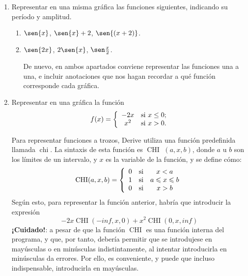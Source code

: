 \begin{enumerate}[leftmargin=*]
	      
	\item Representar en una misma gráfica las funciones siguientes, indicando su período y amplitud.
	      \begin{enumerate}
	      	\item $\sen{x}$, $\sen{x}+2$, $\sen{(x+2)}$.
	      	\item $\sen{2x}$, $2\sen{x}$, $\sen\frac{x}{2}$.
	      	      \begin{indication}
	      	      	De nuevo, en ambos apartados conviene representar las funciones una a una, e incluir anotaciones que nos hagan recordar a qué función
	      	      	corresponde cada gráfica.
	      	      \end{indication}
	      \end{enumerate}
	      
	      
	\item Representar en una gráfica la función
	      \[
	      	\ f(x)=\left\{
	      	\begin{array}{cl}
	      		-2x   & \hbox{si $x\leq0$;} \\
	      		x^{2} & \hbox{si $x>0$.}    \\
	      	\end{array}
	      	\right.
	      \]
	      
	      \begin{indication}
	      	Para representar funciones a trozos, Derive utiliza una función predefinida llamada $\operatorname{chi}$. La sintaxis de esta función es
	      	$\operatorname{CHI}$ $(a,x,b)$, donde $a$ u $b$ son los límites de un intervalo, y $x$ es la variable de la función, y se define cómo:
	      	\[
	      		\operatorname{CHI} (a,x,b) = \left\{ {\begin{array}{*{20}c}
	      			0 & {\text{si}} & {x < a}  \\
	      			1 & {\text{si}} & {a \leqslant x \leqslant b}  \\
	      			0 & {\text{si}} & {x > b}  \\
	      			
	      			\end{array} } \right.
	      	\]
	      	Según esto, para representar la función anterior, habría que introducir la expresión
	      	\[
	      		-2x \operatorname{CHI}(-inf,x,0)+x^2\operatorname{CHI}(0,x,inf)
	      	\]
	      	\textbf{¡Cuidado!}: a pesar de que la función $\operatorname{CHI}$ es una función interna del programa, y que, por tanto, debería permitir
	      	que se introdujese en mayúsculas o en minúsculas indistintamente, al intentar introducirla en minúsculas da errores. Por ello, es
	      	conveniente, y puede que incluso indispensable, introducirla en mayúsculas.
	      \end{indication}
\end{enumerate}


